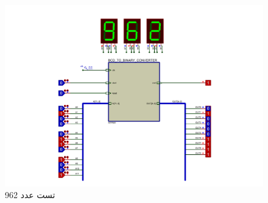 \documentclass{article}
\begin{document}
\begin{figure}
	\centering
	\includegraphics[scale=0.4]{./graphics/tests/962}
	\caption{تست عدد 962}
	\label{fig:962}
\end{figure}
\end{document}
